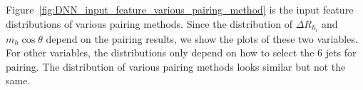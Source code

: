 \documentclass[12pt]{article}
\begin{document}
        Figure~\ref{fig:DNN_input_feature_various_pairing_method} is the input feature distributions of various pairing methods. Since the distribution of $\Delta R_{h_i}$ and $m_{h} \cos\theta$ depend on the pairing results, we show the plots of these two variables. For other variables, the distributions only depend on how to select the 6 jets for pairing. The distribution of various pairing methods looks similar but not the same.
        \begin{figure}[htpb]
            \centering
             \\
             \\
\end{figure}
\end{document}
